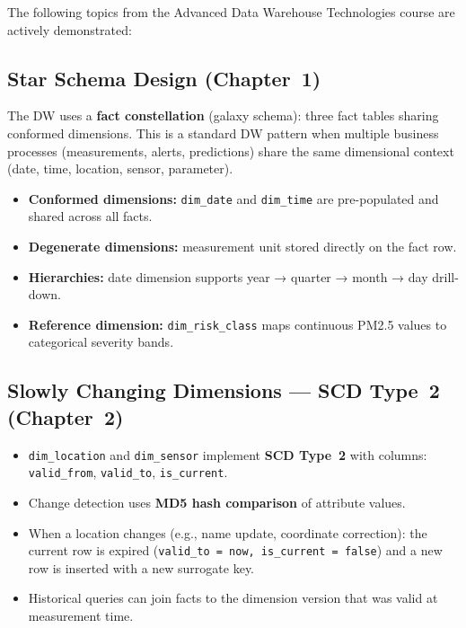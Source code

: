 \documentclass[11pt,a4paper]{article}
\begin{document}
The following topics from the Advanced Data Warehouse Technologies course are actively demonstrated:

\subsection{Star Schema Design (Chapter~1)}

The DW uses a \textbf{fact constellation} (galaxy schema): three fact tables sharing conformed dimensions.
This is a standard DW pattern when multiple business processes (measurements, alerts, predictions)
share the same dimensional context (date, time, location, sensor, parameter).

\begin{itemize}[nosep]
  \item \textbf{Conformed dimensions:} \texttt{dim\_date} and \texttt{dim\_time} are pre-populated and shared across all facts.
  \item \textbf{Degenerate dimensions:} measurement unit stored directly on the fact row.
  \item \textbf{Hierarchies:} date dimension supports year → quarter → month → day drill-down.
  \item \textbf{Reference dimension:} \texttt{dim\_risk\_class} maps continuous PM2.5 values to categorical severity bands.
\end{itemize}

\subsection{Slowly Changing Dimensions --- SCD Type~2 (Chapter~2)}

\begin{itemize}[nosep]
  \item \texttt{dim\_location} and \texttt{dim\_sensor} implement \textbf{SCD Type~2} with columns: \texttt{valid\_from}, \texttt{valid\_to}, \texttt{is\_current}.
  \item Change detection uses \textbf{MD5 hash comparison} of attribute values.
  \item When a location changes (e.g., name update, coordinate correction): the current row is expired (\texttt{valid\_to = now, is\_current = false}) and a new row is inserted with a new surrogate key.
  \item Historical queries can join facts to the dimension version that was valid at measurement time.
\end{itemize}
\end{document}
